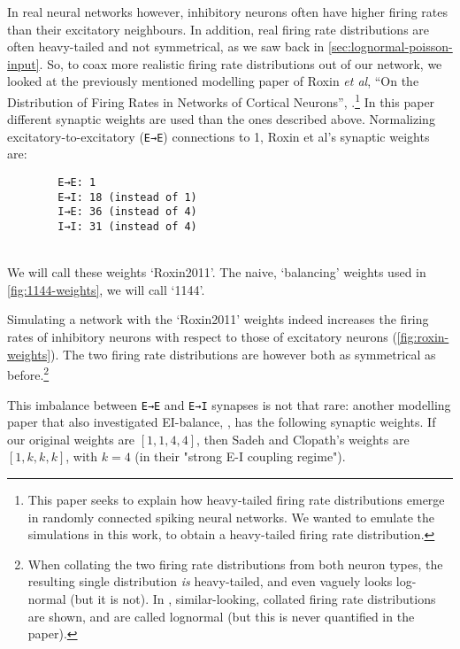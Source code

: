 In real neural networks however, inhibitory neurons often have higher firing rates than their excitatory neighbours. In addition, real firing rate distributions are often heavy-tailed and not symmetrical, as we saw back in \cref{sec:lognormal-poisson-input}.
So, to coax more realistic firing rate distributions out of our network, we looked at the previously mentioned modelling paper of Roxin \emph{et al}, ``On the Distribution of Firing Rates in Networks of Cortical Neurons'', \cite{Roxin2011DistributionFiringRates}.\footnote{
    This paper seeks to explain how heavy-tailed firing rate distributions emerge in randomly connected spiking neural networks. We wanted to emulate the simulations in this work, to obtain a heavy-tailed firing rate distribution.
}
In this paper different synaptic weights are used than the ones described above.
Normalizing excitatory-to-excitatory (\verb|E→E|) connections to 1, Roxin et al's synaptic weights are:\\
\begin{minipage}{\linewidth}
    \begin{verbatim}
        E→E: 1
        E→I: 18 (instead of 1)
        I→E: 36 (instead of 4)
        I→I: 31 (instead of 4)
    \end{verbatim}
\end{minipage}\\
We will call these weights `Roxin2011'. The naive, `balancing' weights used in \cref{fig:1144-weights}, we will call `1144'.

Simulating a network with the `Roxin2011' weights indeed increases the firing rates of inhibitory neurons with respect to those of excitatory neurons (\cref{fig:roxin-weights}). The two firing rate distributions are however both as symmetrical as before.\footnote{
    When collating the two firing rate distributions from both neuron types, the resulting single distribution \emph{is} heavy-tailed, and even vaguely looks log-normal (but it is not). In \cite{Roxin2011DistributionFiringRates}, similar-looking, collated firing rate distributions are shown, and are called lognormal (but this is never quantified in the paper).
}

This imbalance between \verb|E→E| and \verb|E→I| synapses is not that rare: another modelling paper that also investigated EI-balance, \cite{Sadeh2021ExcitatoryinhibitoryBalanceModulates}, has the following synaptic weights. If our original weights are $[1, 1, 4, 4]$, then Sadeh and Clopath's weights are $[1, k, k, k]$, with $k = 4$ (in their "strong E-I coupling regime").

